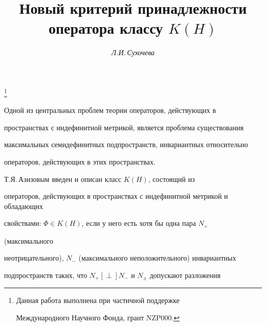 \author{\it Л.И.\,Сухочева}


\title{Новый критерий принадлежности оператора классу $K(H)$}





\thanks{Данная работа выполнена при частичной поддержке


Международного Научного Фонда, грант NZP000.}


\date{}







\pagestyle{plain} %













\maketitle













Одной из центральных проблем теории операторов, действующих в


пространствах с индефинитной метрикой, является проблема существования


максимальных семидефинитных подпространств, инвариантных относительно


операторов, действующих в этих пространствах.





Т.Я.\,Азизовым \cite{Azi} введен и описан класс $K(H)$, состоящий из


операторов, действующих в пространствах с индефинитной метрикой и обладающих


свойствами: $\Phi\in K(H)$, если у него есть хотя бы одна пара $N_+$


(максимального


неотрицательного), $N_-$ (максимального неположительного) инвариантных


подпространств таких, что $N_+[\perp]N_-$ и $N_\pm$ допускают разложения


